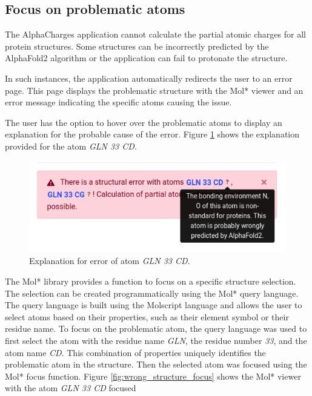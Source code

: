 \documentclass[
  digital,     %
  oneside,     %
  nosansbold,  %
  nocolorbold, %
  lof,         %
  lot,         %
]{fithesis4}
\begin{document}
\subsection{Focus on problematic atoms}

The AlphaCharges application cannot calculate the partial atomic charges for all protein structures. Some structures can be incorrectly predicted by the AlphaFold2 algorithm or the application can fail to protonate the structure.
\parencite{jumper2021alphafold}

In such instances, the application automatically redirects the user to an error page. This page displays the problematic structure with the Mol* viewer and an error message indicating the specific atoms causing the issue.

The user has the option to hover over the problematic atoms to display an explanation for the probable cause of the error. Figure \ref{fig:wrong_structure_text} shows the explanation provided for the atom \textit{GLN 33 CD}.

\begin{figure}[htbp]
  \begin{center}
    \includegraphics[width=12cm]{figures/wrong_structure_text.png}
  \end{center}
  \caption{Explanation for error of atom \textit{GLN 33 CD}.}
  \label{fig:wrong_structure_text}
\end{figure}

The Mol* library provides a function to focus on a specific structure selection. The selection can be created programmatically using the Mol* query language. The query language is built using the Molscript language \parencite{kraulis1991molscript} and allows the user to select atoms based on their properties, such as their element symbol or their residue name. To focus on the problematic atom, the query language was used to first select the atom with the residue name \textit{GLN}, the residue number \textit{33}, and the atom name \textit{CD}. This combination of properties uniquely identifies the problematic atom in the structure. Then the selected atom was focused using the Mol* focus function. Figure \ref{fig:wrong_structure_focus} shows the Mol* viewer with the atom \textit{GLN 33 CD} focused
\end{document}
